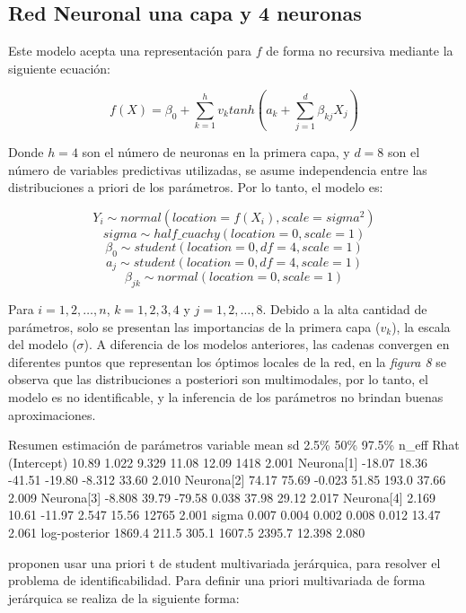 \documentclass[nojss]{jss}
\begin{document}
\subsection{Red Neuronal una capa y 4 neuronas}

Este modelo acepta una representación para $f$ de forma no recursiva mediante la siguiente ecuación:

$$f(X) = \beta_0 + \sum_{k=1}^h v_k tanh\left(a_k + \sum_{j=1}^d \beta_{kj}X_j \right)$$

Donde $h=4$ son el número de neuronas en la primera capa, y $d = 8$ son el número de variables predictivas utilizadas, se asume independencia entre las distribuciones a priori de los parámetros. Por lo tanto, el modelo es:

$$Y_i \sim normal(location = f(X_i),scale = sigma^2)$$
$$sigma \sim half\_cuachy(location = 0,scale = 1)$$
$$\beta_0 \sim student(location = 0,df= 4,scale = 1)$$
$$a_j \sim student(location = 0,df=4,scale = 1)$$
$$\beta_{jk} \sim normal(location = 0,scale = 1)$$

Para $i = 1,2,\ldots,n$, $k = 1,2,3,4$ y $j = 1,2,\ldots,8$. Debido a la alta cantidad de parámetros, solo se presentan las importancias de la primera capa ($v_k$), la escala del modelo ($\sigma$). A diferencia de los modelos anteriores, las cadenas convergen en diferentes puntos que representan los óptimos locales de la red, en la \textit{figura 8} se observa que las distribuciones a posteriori son multimodales, por lo tanto, el modelo es no identificable, y la inferencia de los parámetros no brindan buenas aproximaciones. 

\begin{CodeChunk}	
\begin{CodeOutput}
 		Resumen estimación de parámetros
  variable       mean   sd    2.5\%   50\%  97.5\% n_eff    Rhat
 (Intercept)    10.89  1.022  9.329  11.08  12.09  1418    2.001  
 Neurona[1]    -18.07  18.36 -41.51 -19.80 -8.312  33.60   2.010
 Neurona[2]     74.17  75.69 -0.023  51.85  193.0  37.66   2.009
 Neurona[3]    -8.808  39.79 -79.58  0.038  37.98  29.12   2.017  
 Neurona[4]     2.169  10.61 -11.97  2.547  15.56  12765   2.001 
 sigma          0.007  0.004  0.002  0.008  0.012  13.47   2.061 
 log-posterior 1869.4  211.5  305.1 1607.5 2395.7  12.398  2.080  
\end{CodeOutput}  
\end{CodeChunk}


\cite{Paige2001} proponen usar una priori t de student multivariada jerárquica, para resolver el problema de identificabilidad. Para definir una priori multivariada de forma jerárquica se realiza de la siguiente forma:
\end{document}
